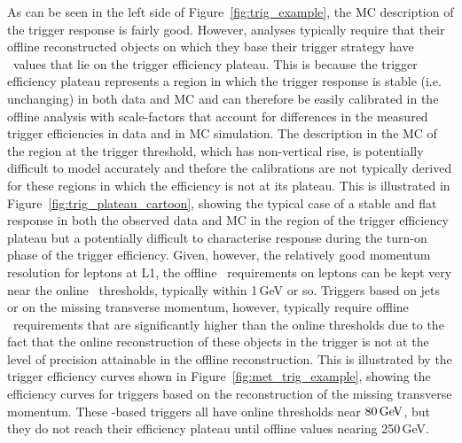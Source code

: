 As can be seen in the left side of Figure~\ref{fig:trig_example}, the MC description of the trigger
response is fairly good.
However, analyses typically require that their offline reconstructed objects on which they base
their trigger strategy have \pT~values that lie on the trigger efficiency plateau.
This is because the trigger efficiency plateau represents a region in which the trigger response
is stable (i.e. unchanging) in both data and MC and can therefore be easily calibrated in the offline analysis
with scale-factors that account for differences in the measured trigger efficiencies in data and in MC simulation.
The description in the MC of the region at the trigger threshold, which has non-vertical rise,
is potentially difficult to model accurately and thefore the calibrations are not typically
derived for these regions in which the efficiency is not at its plateau.
This is illustrated in Figure~\ref{fig:trig_plateau_cartoon}, showing the typical case of a stable
and flat response in both the observed data and MC in the region of the trigger efficiency
plateau but a potentially difficult to characterise response during the turn-on phase of the trigger
efficiency.
Given, however, the relatively good momentum resolution for leptons at L1, the offline \pT~requirements on leptons
can be kept very near the online \pT~thresholds, typically within 1\,GeV or so.
Triggers based on jets or on the missing transverse momentum, however, typically require offline \pT~requirements
that are significantly higher than the online thresholds due to the fact that the online reconstruction of these
objects in the trigger is not at the level of precision attainable in the offline reconstruction.
This is illustrated by the trigger efficiency curves shown in Figure~\ref{fig:met_trig_example}, showing
the efficiency curves for triggers based on the reconstruction of the missing transverse momentum.
These \met-based triggers all have online thresholds near $80\,\text{Ge\kern -0.1em V}$, but they do not reach their
efficiency plateau until offline \met values nearing 250\,GeV.

